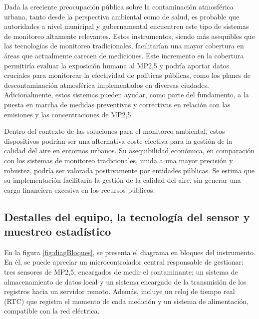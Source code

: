 Dada la creciente preocupación pública sobre la contaminación atmosférica urbana, tanto desde la perspectiva ambiental como de salud, es probable que autoridades a nivel municipal y gubernamental encuentren este tipo de sistemas de monitoreo altamente relevantes. Estos instrumentos, siendo más asequibles que las tecnologías de monitoreo tradicionales, facilitarían una mayor cobertura en áreas que actualmente carecen de mediciones. Este incremento en la cobertura permitiría evaluar la exposición humana al MP2,5 y podría aportar datos cruciales para monitorear la efectividad de políticas públicas, como los planes de descontaminación atmosférica implementados en diversas ciudades. Adicionalmente, estos sistemas pueden ayudar, como parte del fundamento, a la puesta en marcha de medidas preventivas y correctivas en relación con las emisiones y las concentraciones de MP2,5. 

Dentro del contexto de las soluciones para el monitoreo ambiental, estos dispositivos podrían ser una alternativa coste-efectiva para la gestión de la calidad del aire en entornos urbanos. Su asequibilidad económica, en comparación con los sistemas de monitoreo tradicionales, unida a una mayor precisión y robustez, podría ser valorada positivamente por entidades públicas. Se estima que su implementación facilitaría la gestión de la calidad del aire, sin generar una carga financiera excesiva en los recursos públicos.



\subsection{Destalles del equipo, la tecnología del sensor y muestreo estadístico}

En la figura \ref{fig:diagBloques}, se presenta el diagrama en bloques del instrumento. En él, se puede apreciar un microcontrolador central responsable de gestionar: tres sensores de MP2,5, encargados de medir el contaminante; un sistema de almacenamiento de datos local y un sistema encargado de la transmisión de los registros hacia un servidor remoto. Además, incluye un reloj de tiempo real (RTC) que registra el momento de cada medición y un sistema de alimentación, compatible con la red eléctrica.


